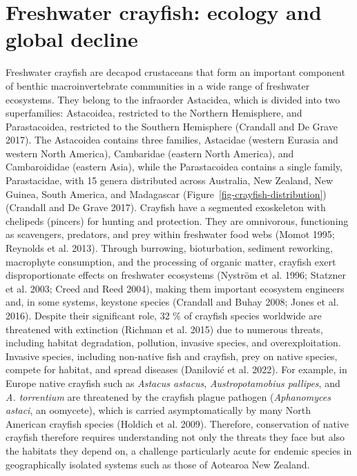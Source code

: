 \documentclass[
  12pt,
  a4paper,
]{scrbook}
\begin{document}
\section{Freshwater crayfish: ecology and global
decline}\label{freshwater-crayfish-ecology-and-global-decline}

Freshwater crayfish are decapod crustaceans that form an important
component of benthic macroinvertebrate communities in a wide range of
freshwater ecosystems. They belong to the infraorder Astacidea, which is
divided into two superfamilies: Astacoidea, restricted to the Northern
Hemisphere, and Parastacoidea, restricted to the Southern Hemisphere
(Crandall and De Grave 2017). The Astacoidea contains three families,
Astacidae (western Eurasia and western North America), Cambaridae
(eastern North America), and Cambaroididae (eastern Asia), while the
Parastacoidea contains a single family, Parastacidae, with 15 genera
distributed across Australia, New Zealand, New Guinea, South America,
and Madagascar (Figure~\ref{fig-crayfish-distribution}) (Crandall and De
Grave 2017). Crayfish have a segmented exoskeleton with chelipeds
(pincers) for hunting and protection. They are omnivorous, functioning
as scavengers, predators, and prey within freshwater food webs (Momot
1995; Reynolds et al. 2013). Through burrowing, bioturbation, sediment
reworking, macrophyte consumption, and the processing of organic matter,
crayfish exert disproportionate effects on freshwater ecosystems
(Nyström et al. 1996; Statzner et al. 2003; Creed and Reed 2004), making
them important ecosystem engineers and, in some systems, keystone
species (Crandall and Buhay 2008; Jones et al. 2016). Despite their
significant role, 32 \% of crayfish species worldwide are threatened
with extinction (Richman et al. 2015) due to numerous threats, including
habitat degradation, pollution, invasive species, and overexploitation.
Invasive species, including non-native fish and crayfish, prey on native
species, compete for habitat, and spread diseases (Danilović et al.
2022). For example, in Europe native crayfish such as \emph{Astacus
astacus}, \emph{Austropotamobius pallipes}, and \emph{A. torrentium} are
threatened by the crayfish plague pathogen (\emph{Aphanomyces astaci},
an oomycete), which is carried asymptomatically by many North American
crayfish species (Holdich et al. 2009). Therefore, conservation of
native crayfish therefore requires understanding not only the threats
they face but also the habitats they depend on, a challenge particularly
acute for endemic species in geographically isolated systems such as
those of Aotearoa New Zealand.
\end{document}
